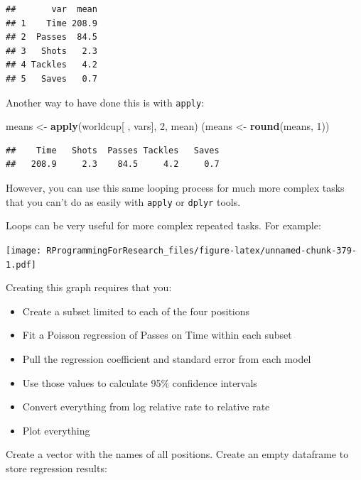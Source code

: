 \documentclass[]{book}
\makeatletter
\newenvironment{Shaded}{\begin{snugshade}}{\end{snugshade}}
\newcommand{\KeywordTok}[1]{\textcolor[rgb]{0.13,0.29,0.53}{\textbf{#1}}}
\newcommand{\DecValTok}[1]{\textcolor[rgb]{0.00,0.00,0.81}{#1}}
\newcommand{\StringTok}[1]{\textcolor[rgb]{0.31,0.60,0.02}{#1}}
\newcommand{\OperatorTok}[1]{\textcolor[rgb]{0.81,0.36,0.00}{\textbf{#1}}}
\newcommand{\NormalTok}[1]{#1}
\providecommand{\tightlist}{%
  \setlength{\itemsep}{0pt}\setlength{\parskip}{0pt}}
\newenvironment{kframe}{%
\medskip{}
\setlength{\fboxsep}{.8em}
 \def\at@end@of@kframe{}%
 \ifinner\ifhmode%
  \def\at@end@of@kframe{\end{minipage}}%
  \begin{minipage}{\columnwidth}%
 \fi\fi%
 \def\FrameCommand##1{\hskip\@totalleftmargin \hskip-\fboxsep
 \colorbox{shadecolor}{##1}\hskip-\fboxsep
     \hskip-\linewidth \hskip-\@totalleftmargin \hskip\columnwidth}%
 \MakeFramed {\advance\hsize-\width
   \@totalleftmargin\z@ \linewidth\hsize
   \@setminipage}}%
 {\par\unskip\endMakeFramed%
 \at@end@of@kframe}
\renewenvironment{Shaded}{\begin{kframe}}{\end{kframe}}
\theoremstyle{definition}
\theoremstyle{definition}
\theoremstyle{definition}
\theoremstyle{remark}
\makeatother
\begin{document}
\begin{verbatim}
##       var  mean
## 1    Time 208.9
## 2  Passes  84.5
## 3   Shots   2.3
## 4 Tackles   4.2
## 5   Saves   0.7
\end{verbatim}

Another way to have done this is with \texttt{apply}:

\begin{Shaded}
\begin{Highlighting}[]
\NormalTok{means <-}\StringTok{ }\KeywordTok{apply}\NormalTok{(worldcup[ , vars], }\DecValTok{2}\NormalTok{, mean)}
\NormalTok{(means <-}\StringTok{ }\KeywordTok{round}\NormalTok{(means, }\DecValTok{1}\NormalTok{))}
\end{Highlighting}
\end{Shaded}

\begin{verbatim}
##    Time   Shots  Passes Tackles   Saves 
##   208.9     2.3    84.5     4.2     0.7
\end{verbatim}

However, you can use this same looping process for much more complex
tasks that you can't do as easily with \texttt{apply} or \texttt{dplyr}
tools.

Loops can be very useful for more complex repeated tasks. For example:

\texttt{[image: RProgrammingForResearch\_files/figure-latex/unnamed-chunk-379-1.pdf]}

Creating this graph requires that you:

\begin{itemize}
\tightlist
\item
  Create a subset limited to each of the four positions
\item
  Fit a Poisson regression of Passes on Time within each subset
\item
  Pull the regression coefficient and standard error from each model
\item
  Use those values to calculate 95\% confidence intervals
\item
  Convert everything from log relative rate to relative rate
\item
  Plot everything
\end{itemize}

Create a vector with the names of all positions. Create an empty
dataframe to store regression results:

\begin{Shaded}
\end{Shaded}
\end{document}
